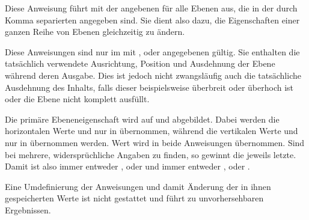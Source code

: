 \begin{Declaration}
\end{Declaration}
Diese Anweisung führt
 mit der angebenen 
für alle Ebenen aus, die in der durch Komma separierten 
angegeben sind. Sie dient also dazu, die Eigenschaften einer ganzen Reihe von
Ebenen gleichzeitig zu ändern.%
\EndIndexGroup

\begin{Declaration}
\end{Declaration}
Diese Anweisungen sind nur im mit ,  oder
 angegebenen  gültig. Sie enthalten die
tatsächlich verwendete Ausrichtung, Position und Ausdehnung der Ebene während
deren Ausgabe. Dies ist jedoch nicht zwangsläufig auch die tatsächliche
Ausdehnung des Inhalts, falls dieser beispielsweise überbreit oder überhoch
ist oder die Ebene nicht komplett ausfüllt.

Die primäre Ebeneneigenschaft  wird auf
 und
 abgebildet. Dabei werden die horizontalen Werte 
und  nur in  übernommen, während die vertikalen
Werte  und  nur in  übernommen
werden. %
Wert  wird in
beide Anweisungen übernommen. Sind bei  mehrere,
widersprüchliche Angaben zu finden, so gewinnt die jeweils letzte. Damit ist
also  immer entweder ,  oder 
und  immer entweder ,  oder .

Eine Umdefinierung der Anweisungen und damit Änderung der in
ihnen gespeicherten Werte ist nicht gestattet und führt zu unvorhersehbaren
Ergebnissen.%
\EndIndexGroup


